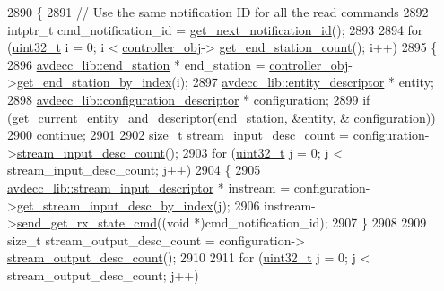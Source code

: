 \begin{DoxyCode}
2890 \{
2891     \textcolor{comment}{// Use the same notification ID for all the read commands}
2892     intptr\_t cmd\_notification\_id = \hyperlink{classcmd__line_a57486218387d1aa9d262eb7c176154ad}{get\_next\_notification\_id}();
2893 
2894     \textcolor{keywordflow}{for} (\hyperlink{parse_8c_a6eb1e68cc391dd753bc8ce896dbb8315}{uint32\_t} i = 0; i < \hyperlink{classcmd__line_af0a7784509e5bf1210a2aa19cea5df70}{controller\_obj}->
      \hyperlink{classavdecc__lib_1_1controller_ab5ddf7b4a9718fe3e821289141f44485}{get\_end\_station\_count}(); i++)
2895     \{
2896         \hyperlink{classavdecc__lib_1_1end__station}{avdecc\_lib::end\_station} * end\_station = 
      \hyperlink{classcmd__line_af0a7784509e5bf1210a2aa19cea5df70}{controller\_obj}->\hyperlink{classavdecc__lib_1_1controller_a2a8ec1205ea0d5fdd6f833285257d0d0}{get\_end\_station\_by\_index}(i);
2897         \hyperlink{classavdecc__lib_1_1entity__descriptor}{avdecc\_lib::entity\_descriptor} * entity;
2898         \hyperlink{classavdecc__lib_1_1configuration__descriptor}{avdecc\_lib::configuration\_descriptor} * configuration;
2899         \textcolor{keywordflow}{if} (\hyperlink{classcmd__line_aa22ed7f036749918eb875043f10060c9}{get\_current\_entity\_and\_descriptor}(end\_station, &entity, &
      configuration))
2900             \textcolor{keywordflow}{continue};
2901 
2902         \textcolor{keywordtype}{size\_t} stream\_input\_desc\_count = configuration->\hyperlink{classavdecc__lib_1_1configuration__descriptor_ab7ef88f0a1d5d8c27f0c4c6687f6a98e}{stream\_input\_desc\_count}();
2903         \textcolor{keywordflow}{for} (\hyperlink{parse_8c_a6eb1e68cc391dd753bc8ce896dbb8315}{uint32\_t} j = 0; j < stream\_input\_desc\_count; j++)
2904         \{
2905             \hyperlink{classavdecc__lib_1_1stream__input__descriptor}{avdecc\_lib::stream\_input\_descriptor} * instream = 
      configuration->\hyperlink{classavdecc__lib_1_1configuration__descriptor_a69cfe9032cea21937b4153878f8a925c}{get\_stream\_input\_desc\_by\_index}(j);
2906             instream->\hyperlink{classavdecc__lib_1_1stream__input__descriptor_a7d6da6754f8090e30071f19b30ff8bb1}{send\_get\_rx\_state\_cmd}((\textcolor{keywordtype}{void} *)cmd\_notification\_id);
2907         \}
2908 
2909         \textcolor{keywordtype}{size\_t} stream\_output\_desc\_count = configuration->
      \hyperlink{classavdecc__lib_1_1configuration__descriptor_a9ebee6c612e3cfec50f5168790bd265c}{stream\_output\_desc\_count}();
2910 
2911         \textcolor{keywordflow}{for} (\hyperlink{parse_8c_a6eb1e68cc391dd753bc8ce896dbb8315}{uint32\_t} j = 0; j < stream\_output\_desc\_count; j++)

\end{DoxyCode}
